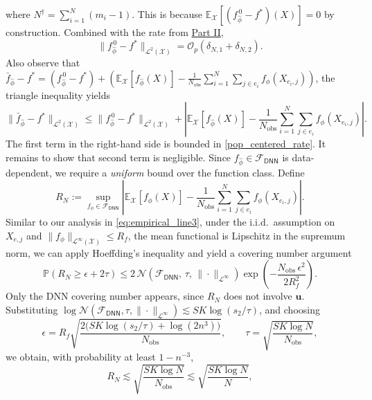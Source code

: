 \documentclass[
  12pt]{article}
\begin{document}
where $N^\dagger = \sum_{i=1}^N(m_i-1)$.
This is because $\mathbb{E}_{\mathcal{X}}[(f_{\widehat{\phi}}^{\,0}-f^*)(X)]=0$ by construction. Combined with the rate from \underline{Part II},
\begin{equation}\label{pop_centered_rate}
\|f_{\widehat{\phi}}^{\,0}-f^*\|_{\mathcal{L}^2(\mathcal{X})}=\mathcal{O}_p(\delta_{N,1}+\delta_{N,2}).
\end{equation}
\noindent Also observe that $\bar{f}_{\widehat{\phi}}-f^*=(f_{\widehat{\phi}}^{\,0}-f^*)+(\mathbb{E}_{\mathcal{X}}[f_{\widehat{\phi}}(X)]-\frac{1}{N_{\operatorname{obs}}}\sum_{i=1}^N\sum_{j\in e_i}f_\phi(X_{e_i,j}))$, the triangle inequality yields
\begin{equation}\label{emp_centered_decomp}
\|\bar{f}_{\widehat{\phi}}-f^*\|_{\mathcal{L}^2(\mathcal{X})}\leq \|f_{\widehat{\phi}}^{\,0}-f^*\|_{\mathcal{L}^2(\mathcal{X})}+\left|\mathbb{E}_{\mathcal{X}}[f_{\widehat{\phi}}(X)]-\frac{1}{N_{\operatorname{obs}}}\sum_{i=1}^N\sum_{j\in e_i}f_\phi(X_{e_i,j})\right|.
\end{equation}
The first term in the right-hand side is bounded in \eqref{pop_centered_rate}. It remains to show that second term is negligible. Since $f_{\widehat{\phi}}\in\mathcal{F}_{\mathsf{DNN}}$ is data-dependent, we require a \emph{uniform} bound over the function class. Define
$$R_N:=\sup_{f_\phi\in\mathcal{F}_{\mathsf{DNN}}}\left|\mathbb{E}_{\mathcal{X}}[f_\phi(X)]-\frac{1}{N_{\operatorname{obs}}}\sum_{i=1}^N\sum_{j\in e_i}f_\phi(X_{e_i,j})\right|.$$
Similar to our analysis in \eqref{eq:empirical_line3}, under the i.i.d.\ assumption on $X_{e,j}$ and $\|f_\phi\|_{\mathcal{L}^\infty(\mathcal{X})}\leq R_f$, the mean functional is Lipschitz in the supremum norm, we can apply Hoeffding's inequality and yield a covering number argument
\begin{equation}\label{centering_tail}
\mathbb{P}\!\left(R_N\geq\epsilon+2\tau\right)\leq 2\,\mathcal{N}\!\left(\mathcal{F}_{\mathsf{DNN}},\,\tau,\,\|\cdot\|_{\mathcal{L}^\infty}\right)\exp\!\left(-\frac{N_{\operatorname{obs}}\,\epsilon^2}{2R_f^2}\right).
\end{equation}
Only the DNN covering number appears, since $R_N$ does not involve $\boldsymbol{u}$. Substituting $\log\mathcal{N}(\mathcal{F}_{\mathsf{DNN}},\tau,\|\cdot\|_{\mathcal{L}^\infty})\lesssim SK\log(s_2/\tau)$, 
and choosing
$$\epsilon=R_f\sqrt{\frac{2\bigl(SK\log(s_2/\tau)+\log(2n^3)\bigr)}{N_{\operatorname{obs}}}},\qquad \tau=\sqrt{\frac{SK\log N}{N_{\operatorname{obs}}}},$$
we obtain, with probability at least $1-n^{-3}$,
\begin{equation}\label{centering_bound}
R_N\lesssim \sqrt{\frac{SK\log N}{N_{\operatorname{obs}}}}\lesssim \sqrt{\frac{SK\log N}{N}},
\end{equation}
\end{document}
